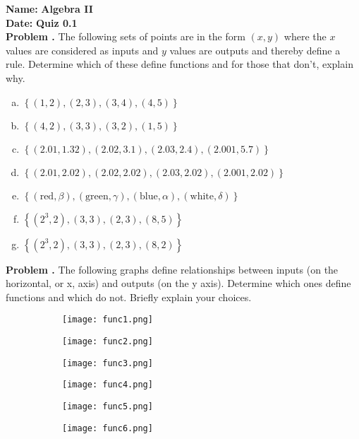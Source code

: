 \documentclass[11pt,letterpaper]{article}
\newcommand{\quiz}[2]{\noindent\textbf{Name: }\makebox[8cm]{\hrulefill} \hfill \textbf{Algebra II} \\  \textbf{Date: } \hfill \textbf{Quiz #2}\\}
\newcommand{\prob}{\noindent\textbf{Problem. }}
\newcounter{problem}
\newcommand{\problem}{
	\stepcounter{problem}%
	\noindent \textbf{Problem \theproblem. }%
}
\newcommand{\pspace}{\par\vspace{\baselineskip}}
\begin{document}
\quiz{\#}{0.1}




\problem The following sets of points are in the form $(x,y)$ where the $x$ values are considered as inputs and $y$ values are outputs and thereby define a rule. Determine which of these define functions and for those that don't, explain why.\\
	\begin{enumerate}[(a)]
	\item $\left\{ (1,2), (2,3), (3,4), (4,5)\right\}$
	\item $\left\{ (4,2), (3,3), (3,2), (1,5)\right\}$
	\item $\left\{ (2.01,1.32), (2.02,3.1), (2.03,2.4), (2.001,5.7)\right\}$
	\item $\left\{ (2.01,2.02), (2.02,2.02), (2.03,2.02), (2.001,2.02)\right\}$
	\item $\left\{ (\text{red},\beta), (\text{green},\gamma), (\text{blue},\alpha), (\text{white},\delta)\right\}$
	\item $\left\{ (2^3,2), (3,3), (2,3), (8,5)\right\}$
	\item $\left\{ (2^3,2), (3,3), (2,3), (8,2)\right\}$
	\end{enumerate} 

\vspace{.5cm}



\problem The following graphs define relationships between inputs (on the horizontal, or x, axis) and outputs (on the y axis). Determine which ones define functions and which do not. Briefly explain your choices. \\
\begin{figure}[h!]
  \centering
  \begin{subfigure}[b]{0.3\linewidth}
    \texttt{[image: func1.png]}
     \caption{}
  \end{subfigure}
  \begin{subfigure}[b]{0.3\linewidth}
    \texttt{[image: func2.png]}
    \caption{}
  \end{subfigure}
  \begin{subfigure}[b]{0.3\linewidth}
    \texttt{[image: func3.png]}
    \caption{}
  \end{subfigure}
  \begin{subfigure}[b]{0.3\linewidth}
    \texttt{[image: func4.png]}
     \caption{}
  \end{subfigure}
  \begin{subfigure}[b]{0.3\linewidth}
    \texttt{[image: func5.png]}
    \caption{}
  \end{subfigure}
  \begin{subfigure}[b]{0.3\linewidth}
    \texttt{[image: func6.png]}
    \caption{}
  \end{subfigure}
\end{figure}
\end{document}
